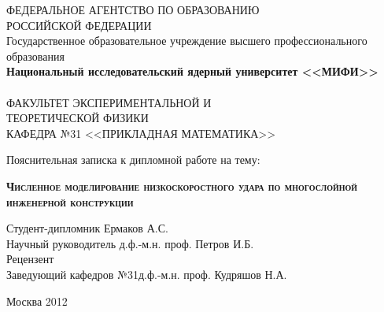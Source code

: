 \begin{titlepage}
\newpage

\begin{center}
ФЕДЕРАЛЬНОЕ АГЕНТСТВО ПО ОБРАЗОВАНИЮ\\РОССИЙСКОЙ ФЕДЕРАЦИИ\\
Государственное образовательное учреждение высшего профессионального образования\\
\textbf{Национальный исследовательский ядерный университет <<МИФИ>>}\\
\hrulefill\\
ФАКУЛЬТЕТ ЭКСПЕРИМЕНТАЛЬНОЙ И\\ТЕОРЕТИЧЕСКОЙ ФИЗИКИ\\
\vspace{1cm}
КАФЕДРА №31 <<ПРИКЛАДНАЯ МАТЕМАТИКА>>\\
\end{center}

\vspace{8em}

\begin{center}
\Large Пояснительная записка к дипломной работе на тему:
\end{center}

\vspace{2.5em}

\begin{center}
\textsc{\textbf{Численное моделирование низкоскоростного удара по многослойной инженерной конструкции}}
\end{center}

\vspace{6em}

\begin{flushleft}
\vspace{1.5em}
Студент-дипломник \hrulefill Ермаков А.С.\\
\vspace{1.5em}
Научный руководитель \hrulefill д.ф.-м.н. проф. Петров И.Б.\\
\vspace{1.5em}
Рецензент \hrulefill \\
\vspace{1.5em}
Заведующий кафедров №31\hrulefill д.ф.-м.н. проф. Кудряшов Н.А.\\
\end{flushleft}

\vspace{\fill}
\begin{center}
Москва 2012
\end{center}

\end{titlepage}
